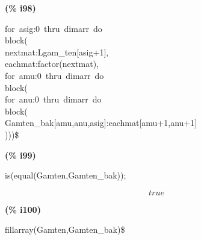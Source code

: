 \documentclass[fleqn]{article}
\begin{document}
\noindent
\begin{minipage}[t]{4.000000em}\color{red}\bfseries
(\% i98)	
\end{minipage}
\begin{minipage}[t]{\textwidth}\color{blue}
for\ asig:0\ thru\ dimarr\ do\\
block(\\
nextmat:Lgam\_ten[asig+1],\\
eachmat:factor(nextmat),\\
for\ amu:0\ thru\ dimarr\ do\\
block(\\
for\ anu:0\ thru\ dimarr\ do\\
block(\\
Gamten\_bak[amu,anu,asig]:eachmat[amu+1,anu+1]\\
)))\$
\end{minipage}

\noindent%



\noindent
\begin{minipage}[t]{4.000000em}\color{red}\bfseries
(\% i99)	
\end{minipage}
\begin{minipage}[t]{\textwidth}\color{blue}
is(equal(Gamten,Gamten\_bak));
\end{minipage}
\[\displaystyle \tag{\% o99} 
true\mbox{}
\]


\noindent
\begin{minipage}[t]{4.000000em}\color{red}\bfseries
(\% i100)	
\end{minipage}
\begin{minipage}[t]{\textwidth}\color{blue}
fillarray(Gamten,Gamten\_bak)\$
\end{minipage}

\noindent%
\end{document}
